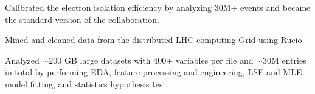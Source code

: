\documentclass[letterpaper]{deedy-resume-openfont}
\begin{document}
\begin{tightemize}
\item Calibrated the electron isolation efficiency by analyzing 30M+ events and became the standard version of the collaboration. %
\item Mined and cleaned data from the distributed LHC computing Grid using Rucio.
\item Analyzed $\sim$200 GB large datasets with 400+ variables per file and $\sim$30M entries in total by performing EDA, feature processing and engineering, LSE and MLE model fitting, and statistics hypothesis test.



\end{tightemize}
\end{document}
